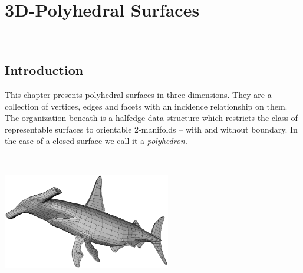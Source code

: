 
\ccParDims

\chapter{3D-Polyhedral Surfaces}
\label{chapterPolyhedron}
\\


\section{Introduction}

This chapter presents polyhedral surfaces in three dimensions. They
are a collection of vertices, edges and facets with an incidence
relationship on them. The organization beneath is a halfedge data
structure which restricts the class of representable surfaces to
orientable 2-manifolds -- with and without boundary. In the case of a
closed surface we call it a {\em polyhedron}.

\begin{ccTexOnly}
    \begin{center}~\hspace{5cm}
      \parbox{0.55\textwidth}{%
          \includegraphics[width=0.55\textwidth]{fig/shark.ps}%
      }
    \end{center}
    \vspace*{-16mm}
\end{ccTexOnly}

